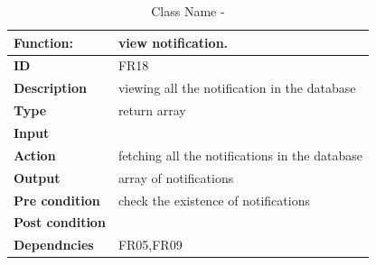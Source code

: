 \documentclass[]{article}
\begin{document}
\FloatBarrier
\begin{table}[h]
\caption{Class Name - }
\label{tab:my-table}
\begin{tabular}{|p{}|p{}|}
\hline
\textbf{Function:} & view notification.
\\ \hline
\textbf{ID}  & FR18           

\\ \hline
\textbf{Description}    & viewing all the notification in the database                                                                    
\\ \hline
\textbf{Type}    & return array       

\\ \hline
\textbf{Input}        & 


\\ \hline
\textbf{Action}            & fetching all the notifications in the database

\\ \hline
\textbf{Output}            & array of notifications

\\ \hline
\textbf{Pre condition}           & check the existence of notifications 

\\ \hline
\textbf{Post condition}           & 


\\ \hline
\textbf{Dependncies}           & FR05,FR09
\\ \hline
\end{tabular}
\end{table}
\end{document}
